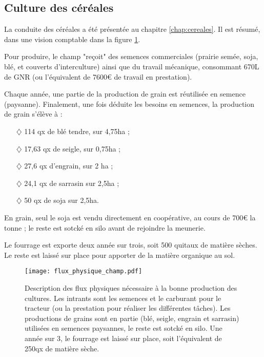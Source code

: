 \documentclass{book}
\begin{document}
\subsection{Culture des céréales}

La conduite des céréales a été présentée au chapitre \ref{chap:cereales}. Il est résumé, dans une vision comptable dans la figure \ref{fig:flux_champ}. 

Pour produire, le champ "reçoit" des semences commerciales (prairie semée, soja, blé, et couverts d'interculture) ainsi que du travail mécanique, consommant 670L de GNR (ou l'équivalent de 7600\euro{} de travail en prestation).


Chaque année, une partie de la production de grain est réutilisée en semence (paysanne). Finalement, une fois déduite les besoins en semences, la production de grain s'élève à :
\begin{itemize}

\item[$\diamondsuit$] 114 qx de blé tendre, sur 4,75ha ; 
\item[$\diamondsuit$] 17,63 qx de seigle, sur 0,75ha ; 
\item[$\diamondsuit$] 27,6 qx d'engrain, sur 2 ha ; 
\item[$\diamondsuit$] 24,1 qx de sarrasin sur 2,5ha ; 
\item[$\diamondsuit$] 50 qx de soja sur 2,5ha.

\end{itemize}
En grain, seul le soja est vendu directement en coopérative, au cours de 700\euro{} la tonne ; le reste est sotcké en silo avant de rejoindre la meunerie.

Le fourrage est exporte deux année sur trois, soit 500 quitaux de matière sèches. Le reste est laissé sur place pour apporter de la matière organique au sol.

\begin{figure}[h!]
\begin{center}
	\texttt{[image: flux\_physique\_champ.pdf]}
	\caption{Description des flux physiques nécessaire à la bonne production des cultures. Les intrants sont les semences et le carburant pour le tracteur (ou la prestation pour réaliser les différentes tâches). Les productions de grains sont en partie (blé, seigle, engrain et sarrasin) utilisées en semences paysannes, le reste est sotcké en silo. Une année sur 3, le fourrage est laissé sur place, soit l'équivalent de 250qx de matière sèche.}
	\label{fig:flux_champ}
\end{center}
\end{figure}
\end{document}
